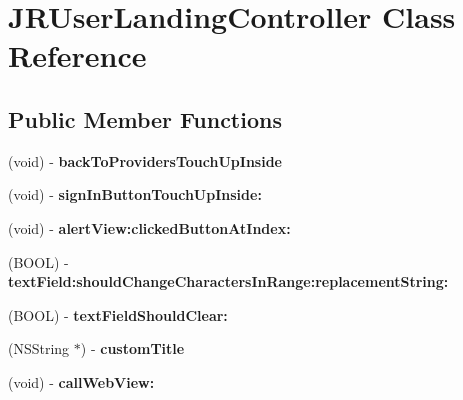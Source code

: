 \hypertarget{interface_j_r_user_landing_controller}{
\section{JRUserLandingController Class Reference}
\label{interface_j_r_user_landing_controller}
}
\subsection*{Public Member Functions}
\begin{DoxyCompactItemize}
\item 
\hypertarget{interface_j_r_user_landing_controller_a06fb35abaa3d4cc10f169a3306edf6fd}{
(void) -\/ {\bfseries backToProvidersTouchUpInside}}
\label{interface_j_r_user_landing_controller_a06fb35abaa3d4cc10f169a3306edf6fd}

\item 
\hypertarget{interface_j_r_user_landing_controller_a21b9dcd018ae8fb7c0730626a2c8a53d}{
(void) -\/ {\bfseries signInButtonTouchUpInside:}}
\label{interface_j_r_user_landing_controller_a21b9dcd018ae8fb7c0730626a2c8a53d}

\item 
\hypertarget{interface_j_r_user_landing_controller_a0e16e3760e4ffe46d950fc1e259461d6}{
(void) -\/ {\bfseries alertView:clickedButtonAtIndex:}}
\label{interface_j_r_user_landing_controller_a0e16e3760e4ffe46d950fc1e259461d6}

\item 
\hypertarget{interface_j_r_user_landing_controller_ade8429302170bd7e5961147fb0b80030}{
(BOOL) -\/ {\bfseries textField:shouldChangeCharactersInRange:replacementString:}}
\label{interface_j_r_user_landing_controller_ade8429302170bd7e5961147fb0b80030}

\item 
\hypertarget{interface_j_r_user_landing_controller_a953d5250c5046a70e59552533efb4d06}{
(BOOL) -\/ {\bfseries textFieldShouldClear:}}
\label{interface_j_r_user_landing_controller_a953d5250c5046a70e59552533efb4d06}

\item 
\hypertarget{interface_j_r_user_landing_controller_ae983c1e62400ab1863d32e4572d4e444}{
(NSString $\ast$) -\/ {\bfseries customTitle}}
\label{interface_j_r_user_landing_controller_ae983c1e62400ab1863d32e4572d4e444}

\item 
\hypertarget{interface_j_r_user_landing_controller_ad22cb0c4aa4bc6446287d9a18be8f5d8}{
(void) -\/ {\bfseries callWebView:}}
\label{interface_j_r_user_landing_controller_ad22cb0c4aa4bc6446287d9a18be8f5d8}

\end{DoxyCompactItemize}
